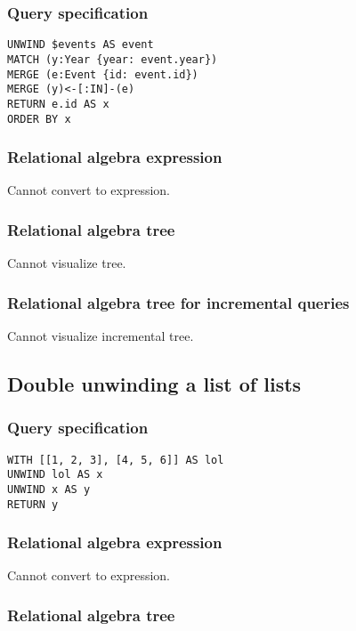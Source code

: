 \subsubsection*{Query specification}

\begin{lstlisting}
UNWIND $events AS event
MATCH (y:Year {year: event.year})
MERGE (e:Event {id: event.id})
MERGE (y)<-[:IN]-(e)
RETURN e.id AS x
ORDER BY x
\end{lstlisting}

\subsubsection*{Relational algebra expression}

Cannot convert to expression.

\subsubsection*{Relational algebra tree}

Cannot visualize tree.

\subsubsection*{Relational algebra tree for incremental queries}

Cannot visualize incremental tree.

\subsection{Double unwinding a list of lists}

\subsubsection*{Query specification}

\begin{lstlisting}
WITH [[1, 2, 3], [4, 5, 6]] AS lol
UNWIND lol AS x
UNWIND x AS y
RETURN y
\end{lstlisting}

\subsubsection*{Relational algebra expression}

Cannot convert to expression.

\subsubsection*{Relational algebra tree}

